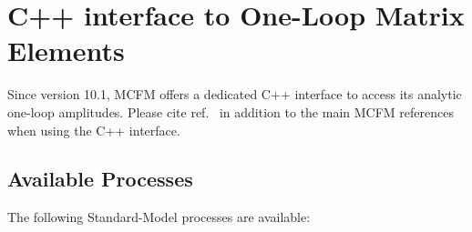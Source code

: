 \hypertarget{c-interface}{%
\section{C++ interface to One-Loop Matrix Elements}\label{c-interface}}

Since version 10.1, MCFM offers a dedicated C++ interface to access its
analytic one-loop amplitudes. Please cite ref.~\cite{Campbell:2021vlt} in
addition to the main MCFM references when using the C++ interface.

\hypertarget{available-processes}{%
\subsection{Available Processes}\label{available-processes}}

The following Standard-Model processes are available:

